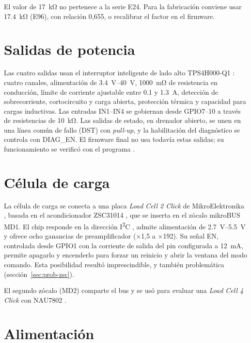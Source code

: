 El valor de \SI{17}{\kilo\ohm} no pertenece a la serie E24. Para la fabricación conviene usar
\SI{17.4}{\kilo\ohm} (E96), con relación 0,655, o recalibrar el factor en el firmware.

\section{Salidas de potencia}

Las cuatro salidas usan el interruptor inteligente de lado alto TPS4H000-Q1 \cite{tps4h000}: cuatro
canales, alimentación de \SIrange{3.4}{40}{\volt}, \SI{1000}{\milli\ohm} de resistencia en
conducción, límite de corriente ajustable entre \num{0.1} y \SI{1.3}{\ampere}, detección de
sobrecorriente, cortocircuito y carga abierta, protección térmica y capacidad para cargas
inductivas. Las entradas IN1--IN4 se gobiernan desde GPIO7--10 a través de resistencias de
\SI{10}{\kilo\ohm}. Las salidas de estado, en drenador abierto, se unen en una línea común de fallo
(DST) con \emph{pull-up}, y la habilitación del diagnóstico se controla con DIAG\_EN. El firmware
final no usa todavía estas salidas; su funcionamiento se verificó con el programa
 .

\section{Célula de carga}

La célula de carga se conecta a una placa \emph{Load Cell 2 Click} de MikroElektronika
\cite{mikroelc2}, basada en el acondicionador ZSC31014 \cite{zsc31014}, que se inserta en el zócalo
mikroBUS MD1. El chip responde en la dirección I\textsuperscript{2}C , admite
alimentación de \SIrange{2.7}{5.5}{\volt} y ofrece ocho ganancias de preamplificador (×1,5 a
×192). Su señal EN, controlada desde GPIO1 con la corriente de salida del pin configurada a
\SI{12}{\milli\ampere}, permite apagarlo y encenderlo para forzar un reinicio y abrir la ventana del
modo comando. Esta posibilidad resultó imprescindible, y también problemática
(sección~\ref{sec:prob-zsc}).

El segundo zócalo (MD2) comparte el bus y se usó para evaluar una \emph{Load Cell 4 Click} con
NAU7802 \cite{nau7802} .

\section{Alimentación}

